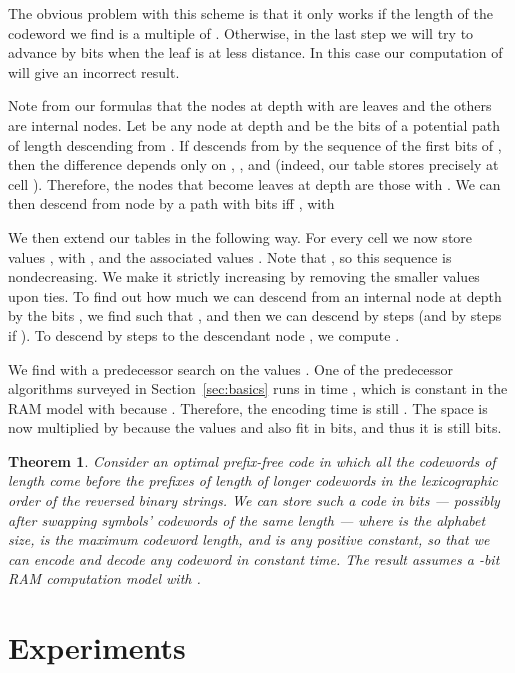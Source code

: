 \documentclass[preprint,12pt]{elsarticle}
\newtheorem{theorem}{Theorem}
\begin{document}
The obvious problem with this scheme is that it only works if the length 
of the codeword we find is a multiple of . Otherwise,
in the last step we will try to advance by  bits when the leaf is at less
distance. In this case our computation of  will give an incorrect result.

Note from our formulas that the nodes  at depth  with
 are leaves and the others are internal nodes.
Let  be any node at depth  and  be the bits of a potential
path of length  descending from . If  descends from  by the sequence
 of the first  bits of , then the difference 
 depends only on , , and  (indeed, our table 
stores precisely  at cell ). Therefore, the nodes  that 
become 
leaves at depth  are those with . We can
then descend from node  by a path with  bits  iff ,
with


We then extend our tables in the following way. For every cell  we
now store  values , with , and the associated 
values . Note that , so this sequence 
is nondecreasing. We make it strictly increasing by removing the smaller  
values upon ties. To find out how much we can descend from an internal node 
 at depth  by the  bits , 
we find  such that , and then we can 
descend by  steps (and by  steps if ). To descend by
 steps to the descendant node , we compute .

We find  with a predecessor search on the  values .
One of the predecessor algorithms surveyed in Section~\ref{sec:basics} runs 
in time , which is constant in the RAM model with 
because . Therefore, the encoding time is still 
. The space is now multiplied by  because the
values  and  also fit in  bits, and thus
it is still  bits.

\begin{theorem}
\label{thm:matrices}
Consider an optimal prefix-free code in which all the codewords of length 
 come before the prefixes of length  of longer codewords in the 
lexicographic order of the reversed binary strings.
We can store such a code in  bits --- possibly after swapping symbols' codewords of the same length --- where  is the alphabet size,  is the maximum codeword length, and  is any positive constant, so that we can encode and decode any codeword in constant time.
The result assumes a -bit RAM computation model with .
\end{theorem}


\section{Experiments} \label{sec:exp}
\end{document}
